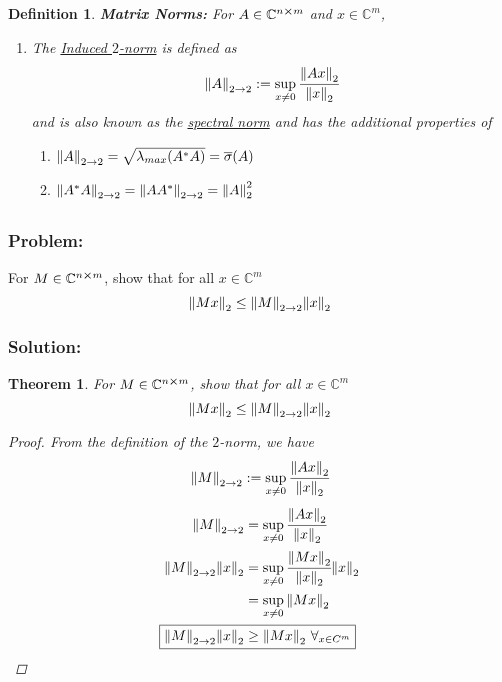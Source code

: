 \documentclass[letter]{article}
\numberwithin{equation}{section}
\newcommand{\C}{\mathbb{C}}
\newtheorem{definition}{Definition}
\newtheorem{theorem}{Theorem}
\begin{document}
\begin{definition}
    \textbf{Matrix Norms:}
    For $A \in \C^{n \cross m}$ and $x \in \C^{m}$, \begin{enumerate}
        \item The \emph{\underline{Induced $2$-norm}} is defined as \[
            \norm{A}_{2\to2} := \sup_{x \neq 0} \cfrac{\norm{A x}_2}{\norm{x}_2}
        \] and is also known as the \emph{\underline{spectral norm}} and has the additional properties of \begin{enumerate}
            \item $\norm{A}_{2\to2} = \sqrt{\lambda_{max}(A^* A)} = \overline{\sigma}(A)$
            \item $\norm{A^*A}_{2\to2} = \norm{A A^*}_{2\to2} = \norm{A}_2^2$
        \end{enumerate}
    \end{enumerate}
\end{definition}

\subsection{}
\subsubsection*{Problem:}
For $M \in \C^{n \cross m}$, show that for all $x \in \C^m$ \[
    \norm{M x}_2 \leq \norm{M}_{2\to 2} \norm{x}_2
\]

\subsubsection*{Solution:}
\begin{theorem}
    For $M \in \C^{n \cross m}$, show that for all $x \in \C^m$ \[
        \norm{M x}_2 \leq \norm{M}_{2\to 2} \norm{x}_2
    \]
    \begin{proof}
        From the definition of the $2$-norm, we have\[
            \norm{M}_{2\to2} := \sup_{x \neq 0} \cfrac{\norm{A x}_2}{\norm{x}_2}
        \]\begin{align*}
            \norm{M}_{2\to2} &= \sup_{x \neq 0} \cfrac{\norm{A x}_2}{\norm{x}_2}\\
            \norm{M}_{2\to2} \norm{x}_2 &= \sup_{x \neq 0} \cfrac{\norm{M x}_2}{\norm{x}_2} \norm{x}_2\\
                &= \sup_{x \neq 0} \norm{M x}_2\\
            \Aboxed{
                \norm{M}_{2\to2} \norm{x}_2 
                    &\geq \norm{M x}_2 \ \forall_{x \in C^{m}}
            }
        \end{align*}
    \end{proof}
\end{theorem}
\end{document}
